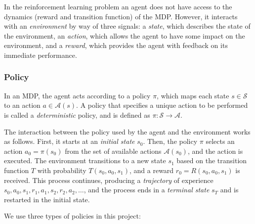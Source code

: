 \documentclass{article}
\newcommand{\GithubURL}[1]{[\href{https://github.com/davidrobles/mlnd-capstone-code/blob/master/#1}{source}]}
\begin{document}
In the reinforcement learning problem an agent does not have access to the dynamics (reward and
transition function) of the MDP. However, it interacts with an \emph{environment} by way of three
signals: a \emph{state}, which describes the state of the environment, an \emph{action}, which
allows the agent to have some impact on the environment, and a \emph{reward}, which provides the
agent with feedback on its immediate performance.

\subsubsection{Policy}


In an MDP, the agent acts according to a policy $\pi$, which maps each state $s \in \mathcal{S}$ to
an action $a \in \mathcal{A}(s)$. A policy that specifies a unique action to be performed is called
a \emph{deterministic} policy, and is defined as $\pi : \mathcal{S} \rightarrow \mathcal{A}$.

The interaction between the policy used by the agent and the environment works as follows. First, it
starts at an \emph{initial state} $s_0$. Then, the policy $\pi$ selects an action $a_0 = \pi(s_0)$
from the set of available actions $\mathcal{A}(s_0)$, and the action is executed. The environment
transitions to a new state $s_1$ based on the transition function $T$ with probability
$T(s_0,a_0,s_1)$, and a reward $r_0 = R(s_0, a_0, s_1)$ is received. This process continues,
producing a \emph{trajectory} of experience $s_0, a_0, s_1, r_1, a_1, s_2, r_2, a_2, \dots$, and the
process ends in a \emph{terminal state} $s_T$ and is restarted in the initial state.

We use three types of policies in this project:
\end{document}
